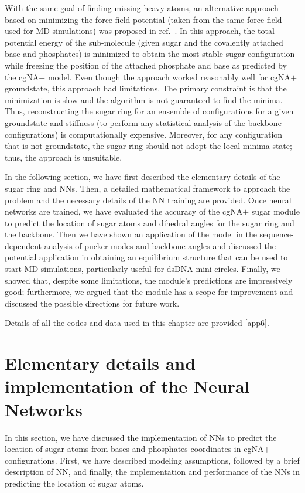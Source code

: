 With the same goal of finding missing heavy atoms, an alternative approach based on minimizing the force field potential (taken from the same force field used for MD simulations) was proposed in ref.~\cite{patelithesis}.
In this approach, the total potential energy of the sub-molecule (given sugar and the covalently attached base and phosphates) is minimized to obtain the most stable sugar configuration while freezing the position of the attached phosphate and base as predicted by the cgNA$+$ model.
Even though the approach worked reasonably well for cgNA$+$ groundstate, this approach had limitations.
The primary constraint is that the minimization is slow and the algorithm is not guaranteed to find the minima.
Thus, reconstructing the sugar ring for an ensemble of configurations for a given groundstate and stiffness (to perform any statistical analysis of the backbone configurations) is computationally expensive.
Moreover, for any configuration that is not groundstate, the sugar ring should not adopt the local minima state; thus, the approach is unsuitable.

In the following section, we have first described the elementary details of the sugar ring and NNs.
Then, a detailed mathematical framework to approach the problem and the necessary details of the NN training are provided.
Once neural networks are trained, we have evaluated the accuracy of the cgNA$+$ sugar module to predict the location of sugar atoms and dihedral angles for the sugar ring and the backbone.
Then we have shown an application of the model in the sequence-dependent analysis of pucker modes and backbone angles and discussed the potential application in obtaining an equilibrium structure that can be used to start MD simulations, particularly useful for dsDNA mini-circles.
Finally, we showed that, despite some limitations, the module's predictions are impressively good; furthermore, we argued that the module has a scope for improvement and discussed the possible directions for future work.

Details of all the codes and data used in this chapter are provided \cref{app6}. 

\section{Elementary details and implementation of the Neural Networks}
In this section, we have discussed the implementation of NNs to predict the location of sugar atoms from bases and phosphates coordinates in cgNA$+$ configurations. 
First, we have described modeling assumptions, followed by a brief description of NN, and finally, the implementation and performance of the NNs in predicting the location of sugar atoms.

